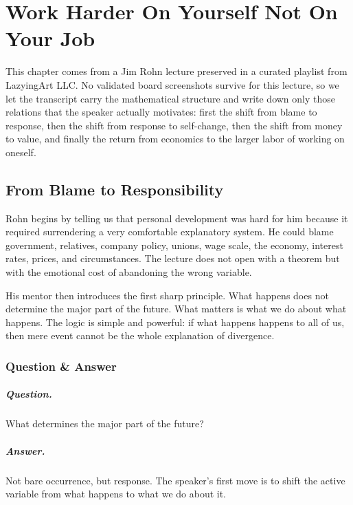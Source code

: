 \chapter{Work Harder On Yourself Not On Your Job}

This chapter comes from a Jim Rohn lecture preserved in a curated playlist from LazyingArt LLC. No validated board screenshots survive for this lecture, so we let the transcript carry the mathematical structure and write down only those relations that the speaker actually motivates: first the shift from blame to response, then the shift from response to self-change, then the shift from money to value, and finally the return from economics to the larger labor of working on oneself.

\section{From Blame to Responsibility}

Rohn begins by telling us that personal development was hard for him because it required surrendering a very comfortable explanatory system. He could blame government, relatives, company policy, unions, wage scale, the economy, interest rates, prices, and circumstances. The lecture does not open with a theorem but with the emotional cost of abandoning the wrong variable.

His mentor then introduces the first sharp principle. What happens does not determine the major part of the future. What matters is what we do about what happens. The logic is simple and powerful: if what happens happens to all of us, then mere event cannot be the whole explanation of divergence.

\subsection{Question \& Answer}

\paragraph{Question.} What determines the major part of the future?

\paragraph{Answer.} Not bare occurrence, but response. The speaker's first move is to shift the active variable from what happens to what we do about it.

